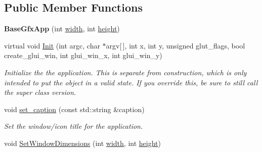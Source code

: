 \subsection*{Public Member Functions}
\begin{DoxyCompactItemize}
\item 
{\bfseries Base\+Gfx\+App} (int \hyperlink{classimage__tools_1_1BaseGfxApp_a2fe403c5392f624477c2ce4429f1a7b5}{width}, int \hyperlink{classimage__tools_1_1BaseGfxApp_aa961e13a7a8e6062204223cc33ac7503}{height})\hypertarget{classimage__tools_1_1BaseGfxApp_abdf78453f987997db4f4970b3b873d19}{}\label{classimage__tools_1_1BaseGfxApp_abdf78453f987997db4f4970b3b873d19}

\item 
virtual void \hyperlink{classimage__tools_1_1BaseGfxApp_a7e7e8df01cdbb96d13b7779a1f17622d}{Init} (int argc, char $\ast$argv\mbox{[}$\,$\mbox{]}, int x, int y, unsigned glut\+\_\+flags, bool create\+\_\+glui\+\_\+win, int glui\+\_\+win\+\_\+x, int glui\+\_\+win\+\_\+y)\hypertarget{classimage__tools_1_1BaseGfxApp_a7e7e8df01cdbb96d13b7779a1f17622d}{}\label{classimage__tools_1_1BaseGfxApp_a7e7e8df01cdbb96d13b7779a1f17622d}

\begin{DoxyCompactList}\small\item\em Initialize the the application. This is separate from construction, which is only intended to put the object in a valid state. If you override this, be sure to still call the super class version. \end{DoxyCompactList}\item 
void \hyperlink{classimage__tools_1_1BaseGfxApp_a82465649f9a908d341e1db1a2e39bdc8}{set\+\_\+caption} (const std\+::string \&caption)\hypertarget{classimage__tools_1_1BaseGfxApp_a82465649f9a908d341e1db1a2e39bdc8}{}\label{classimage__tools_1_1BaseGfxApp_a82465649f9a908d341e1db1a2e39bdc8}

\begin{DoxyCompactList}\small\item\em Set the window/icon title for the application. \end{DoxyCompactList}\item 
void \hyperlink{classimage__tools_1_1BaseGfxApp_aeaa3a1aef12d88e4ab0665ff841e8d8d}{Set\+Window\+Dimensions} (int \hyperlink{classimage__tools_1_1BaseGfxApp_a2fe403c5392f624477c2ce4429f1a7b5}{width}, int \hyperlink{classimage__tools_1_1BaseGfxApp_aa961e13a7a8e6062204223cc33ac7503}{height})\hypertarget{classimage__tools_1_1BaseGfxApp_aeaa3a1aef12d88e4ab0665ff841e8d8d}{}\label{classimage__tools_1_1BaseGfxApp_aeaa3a1aef12d88e4ab0665ff841e8d8d}


\end{DoxyCompactItemize}
